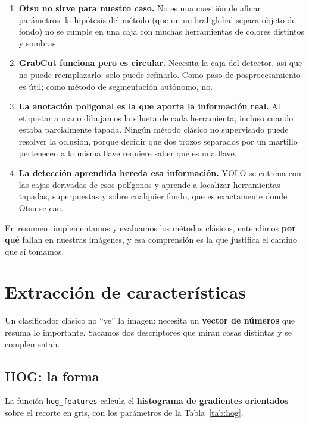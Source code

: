 \documentclass[11pt,a4paper]{article}
\begin{document}
\begin{enumerate}
  \item \textbf{Otsu no sirve para nuestro caso.} No es una cuestión de afinar parámetros: la
        hipótesis del método (que un umbral global separa objeto de fondo) no se cumple en una caja
        con muchas herramientas de colores distintos y sombras.
  \item \textbf{GrabCut funciona pero es circular.} Necesita la caja del detector, así que no puede
        reemplazarlo: solo puede refinarlo. Como paso de posprocesamiento es útil; como método de
        segmentación autónomo, no.
  \item \textbf{La anotación poligonal es la que aporta la información real.} Al etiquetar a mano
        dibujamos la silueta de cada herramienta, incluso cuando estaba parcialmente tapada. Ningún
        método clásico no supervisado puede resolver la oclusión, porque decidir que dos trozos
        separados por un martillo pertenecen a la misma llave requiere saber qué es una llave.
  \item \textbf{La detección aprendida hereda esa información.} YOLO se entrena con las cajas
        derivadas de esos polígonos y aprende a localizar herramientas tapadas, superpuestas y
        sobre cualquier fondo, que es exactamente donde Otsu se cae.
\end{enumerate}

En resumen: implementamos y evaluamos los métodos clásicos, entendimos \textbf{por qué} fallan en
nuestras imágenes, y esa comprensión es la que justifica el camino que sí tomamos.

\section{Extracción de características}
\label{sec:features}

Un clasificador clásico no \enquote{ve} la imagen: necesita un \textbf{vector de números} que
resuma lo importante. Sacamos dos descriptores que miran cosas distintas y se complementan.

\subsection{HOG: la forma}

La función \texttt{hog\_features} calcula el \textbf{histograma de gradientes
orientados}~\cite{hog} sobre el recorte en gris, con los parámetros de la Tabla~\ref{tab:hog}.
\end{document}
